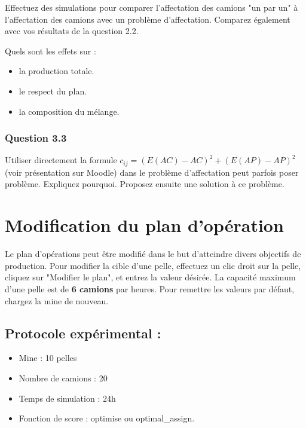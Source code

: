 \documentclass[letterpaper,12pt]{article}
\begin{document}
	Effectuez des simulations pour comparer l'affectation des camions "un par un" à l'affectation des camions avec un problème d'affectation. Comparez également avec vos résultats de la question 2.2.
	
	Quels sont les effets sur :
	
	\begin{itemize}
		\item la production totale.
		\item le respect du plan.
		\item la composition du mélange.
	\end{itemize}
	
	\subsubsection*{Question 3.3}
	Utiliser directement la formule $c_{ij} = \left(E(AC)-AC\right)^2 + \left(E(AP)-AP\right)^2$ (voir présentation sur Moodle) dans le problème d'affectation peut parfois poser problème. Expliquez pourquoi. Proposez ensuite une solution à ce problème.
	
	
	
	
	\section{Modification du plan d'opération}
	
	Le plan d'opérations peut être modifié dans le but d'atteindre divers objectifs de production. Pour modifier la cible d'une pelle, effectuez un clic droit sur la pelle, cliquez sur "Modifier le plan", et entrez la valeur désirée. La capacité maximum d'une pelle est de \textbf{6 camions} par heures. Pour remettre les valeurs par défaut, chargez la mine de nouveau.
	
	
	
	
	\subsection*{Protocole expérimental : }
	
	\begin{itemize}
		\item Mine : 10 pelles
		\item Nombre de camions : 20
		\item Temps de simulation : 24h
		\item Fonction de score : optimise ou optimal\_assign.
	\end{itemize}
	
\end{document}
